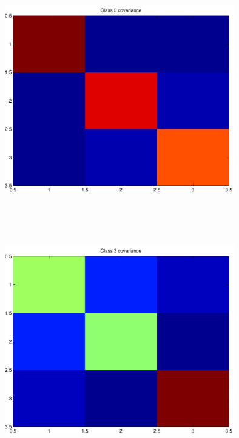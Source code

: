 \documentclass[9pt]{article}
\theoremstyle{plain}
\theoremstyle{definition}
\theoremstyle{remark}
\numberwithin{equation}{section}
\begin{document}
\includegraphics[width=10.0cm,height=10.0cm]{rv2_corr.pdf}

\includegraphics[width=10.0cm,height=10.0cm]{rv3_corr.pdf}
\end{document}
